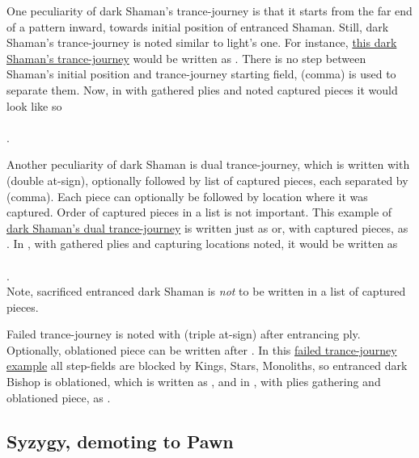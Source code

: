 One peculiarity of dark Shaman's trance-journey is that it starts from the far end of a pattern inward,
towards initial position of entranced Shaman. Still, dark Shaman's trance-journey is noted similar to
light's one. For instance,
\hyperref[fig:scn_cot_22_dark_dark_shaman_interaction_start]{this dark Shaman's trance-journey} would be
written as .
There is no step between Shaman's initial position and trance-journey starting field, \alg{,} (comma) is used
to separate them. Now, in  with gathered plies and noted captured pieces it would look like so\\
\\
\alg{[He12,w18..q16*P..k14*N..c18]}.

Another peculiarity of dark Shaman is dual trance-journey, which is written with  (double at-sign),
optionally followed by list of captured pieces, each separated by \alg{,} (comma). Each piece can optionally
be followed by location where it was captured. Order of captured pieces in a list is not important. This
example of
\hyperref[fig:scn_cot_24_dark_dark_shaman_double_interaction_start]{dark Shaman's dual trance-journey} is
written just as  or, with captured pieces, as .
In , with gathered plies and capturing locations noted, it would be written as\\
\\
.\\
Note, sacrificed entranced dark Shaman is \emph{not} to be written in a list of captured pieces.

Failed trance-journey is noted with  (triple at-sign) after entrancing ply. Optionally, oblationed
piece can be written after . In this
\hyperref[fig:scn_o_23_trance_journey_failed]{failed trance-journey example} all step-fields are blocked by
Kings, Stars, Monoliths, so entranced dark Bishop is oblationed, which is written as ,
and in , with plies gathering and oblationed piece, as .

\subsection*{Syzygy, demoting to Pawn}
\label{sec:Appendix/Notation/Syzygy, demoting to Pawn}

